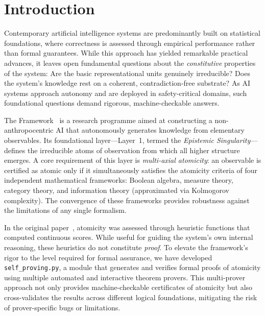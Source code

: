 \newpage
\section{Introduction}

Contemporary artificial intelligence systems are predominantly built on statistical foundations, where correctness is assessed through empirical performance rather than formal guarantees. While this approach has yielded remarkable practical advances, it leaves open fundamental questions about the \textit{constitutive} properties of the system: Are the basic representational units genuinely irreducible? Does the system's knowledge rest on a coherent, contradiction-free substrate? As AI systems approach autonomy and are deployed in safety-critical domains, such foundational questions demand rigorous, machine-checkable answers.

The \Apeiron{} Framework~\cite{beniers2026apeiron} is a research programme aimed at constructing a non-anthropocentric AI that autonomously generates knowledge from elementary observables. Its foundational layer—Layer~1, termed the \textit{Epistemic Singularity}—defines the irreducible atoms of observation from which all higher structure emerges. A core requirement of this layer is \textit{multi-axial atomicity}: an observable is certified as atomic only if it simultaneously satisfies the atomicity criteria of four independent mathematical frameworks: Boolean algebra, measure theory, category theory, and information theory (approximated via Kolmogorov complexity). The convergence of these frameworks provides robustness against the limitations of any single formalism.

In the original \Apeiron{} paper~\cite{beniers2026apeiron}, atomicity was assessed through heuristic functions that computed continuous scores. While useful for guiding the system's own internal reasoning, these heuristics do not constitute \textit{proof}. To elevate the framework's rigor to the level required for formal assurance, we have developed \texttt{self\_proving.py}, a module that generates and verifies formal proofs of atomicity using multiple automated and interactive theorem provers. This multi-prover approach not only provides machine-checkable certificates of atomicity but also cross-validates the results across different logical foundations, mitigating the risk of prover-specific bugs or limitations.

